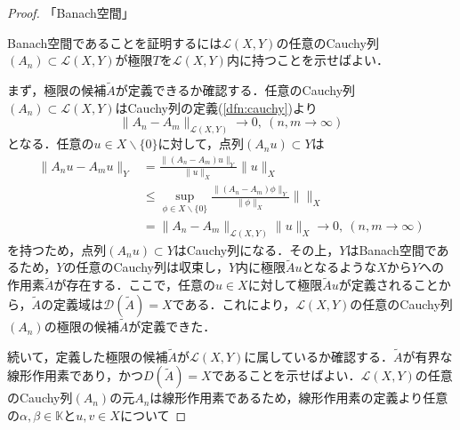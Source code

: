 \documentclass[11pt,a4paper,titlepage]{jsreport}
\theoremstyle{definition}
\begin{document}
\begin{proof}
  「Banach空間」

  Banach空間であることを証明するには$\mathcal{L}(X,Y)$の任意のCauchy列$(A_n)\subset \mathcal{L}(X,Y)$が極限$T$を$\mathcal{L}(X,Y)$内に持つことを示せばよい．

  まず，極限の候補$\tilde{A}$が定義できるか確認する．任意のCauchy列$(A_n)\subset \mathcal{L}(X,Y)$はCauchy列の定義(\ref{dfn:cauchy})より
  \begin{equation*}
    \|A_n-A_m\|_{\mathcal{L}(X,Y)} \rightarrow 0,\ (n,m\rightarrow \infty)
  \end{equation*}
  となる．任意の$u\in X\backslash \{0\}$に対して，点列$(A_nu) \subset Y$は
  \begin{align*}
    \|A_n u-A_mu\|_Y & = \frac{\|(A_n-A_m)u\|_Y}{\|u\|_X}\|u\|_X                                         \\
                     & \leq \sup_{\phi\in X\backslash\{0\}} \frac{\|(A_n-A_m)\phi\|_Y}{\|\phi\|_X}\|\|_X \\
                     & = \|A_n-A_m\|_{\mathcal{L}(X,Y)}\|u\|_X \rightarrow 0,\ (n,m \rightarrow \infty)
  \end{align*}
  を持つため，点列$(A_nu)\subset Y$はCauchy列になる．その上，$Y$はBanach空間であるため，$Y$の任意のCauchy列は収束し，$Y$内に極限$\tilde{A}u$となるような$X$から$Y$への作用素$\tilde{A}$が存在する．ここで，任意の$u\in X$に対して極限$\tilde{A}u$が定義されることから，$\tilde{A}$の定義域は$\mathcal{D}(\tilde{A})=X$である．これにより，$\mathcal{L}(X,Y)$の任意のCauchy列$(A_n)$の極限の候補$\tilde{A}$が定義できた．

  続いて，定義した極限の候補$\tilde{A}$が$\mathcal{L}(X,Y)$に属しているか確認する．$\tilde{A}$が有界な線形作用素であり，かつ$D(\tilde{A})=X$であることを示せばよい．$\mathcal{L}(X,Y)$の任意のCauchy列$(A_n)$の元$A_n$は線形作用素であるため，線形作用素の定義より任意の$\alpha,\beta \in \mathbb{K}$と$u,v\in X$について


\end{proof}
\end{document}
